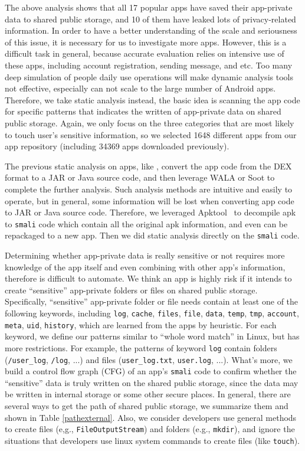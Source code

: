 \documentclass{sig-alternate}
\begin{document}
The above analysis shows that all 17 popular apps have saved their app-private data to shared public storage, and 10 of them have leaked lots of privacy-related information. In order to have a better understanding of the scale and seriousness of this issue, it is necessary for us to investigate more apps. However, this is a difficult task in general, because accurate evaluation relies on intensive use of these apps, including account registration, sending message, and etc. Too many deep simulation of people daily use operations will make dynamic analysis tools not effective, especially can not scale to the large number of Android apps. Therefore, we take static analysis instead, the basic idea is scanning the app code for specific patterns that indicates the written of app-private data on shared public storage. Again, we only focus on the three categories that are most likely to touch user's sensitive information, so we selected 1648 different apps from our app repository (including 34369 apps downloaded previously).

The previous static analysis on apps, like \cite{gibler2012androidleaks, au2012pscout}, convert the app code from the DEX format to a JAR or Java source code, and then leverage WALA \cite{finktj} or Soot \cite{vallee1999soot} to complete the further analysis. Such analysis methods are intuitive and easily to operate, but in general, some information will be lost when converting app code to JAR or Java source code. Therefore, we leveraged Apktool~\cite{Apktool} to decompile apk to \texttt{smali} code which contain all the original apk information, and even can be repackaged to a new app. Then we did static analysis directly on the \texttt{smali} code.

Determining whether app-private data is really sensitive or not requires more knowledge of the app itself and even combining with other app's information, therefore is difficult to automate. We think an app is highly risk if it intends to create ``sensitive'' app-private folders or files on shared public storage. Specifically, ``sensitive'' app-private folder or file needs contain at least one of the following keywords, including \texttt{log}, \texttt{cache}, \texttt{files}, \texttt{file}, \texttt{data}, \texttt{temp}, \texttt{tmp}, \texttt{account}, \texttt{meta}, \texttt{uid}, \texttt{history}, which are learned from the apps by heuristic. For each keyword, we define our patterns similar to ``whole word match'' in Linux, but has more restrictions. For example, the patterns of keyword  \texttt{log} contain folders (\texttt{/user\_log}, \texttt{/log}, ...) and files (\texttt{user\_log.txt}, \texttt{user.log}, ...). What's more, we build a control flow graph (CFG) of an app's \texttt{smali} code to confirm whether the ``sensitive'' data is truly written on the shared public storage, since the data may be written in internal storage or some other secure places. In general, there are several ways to get the path of shared public storage, we summarize them and shown in Table \ref{pathexternal}. Also, we consider developers use general methods to create files (e,g., \texttt{FileOutputStream}) and folders (e.g., \texttt{mkdir}), and ignore the situations that developers use linux system commands to create files (like \texttt{touch}).
\end{document}
